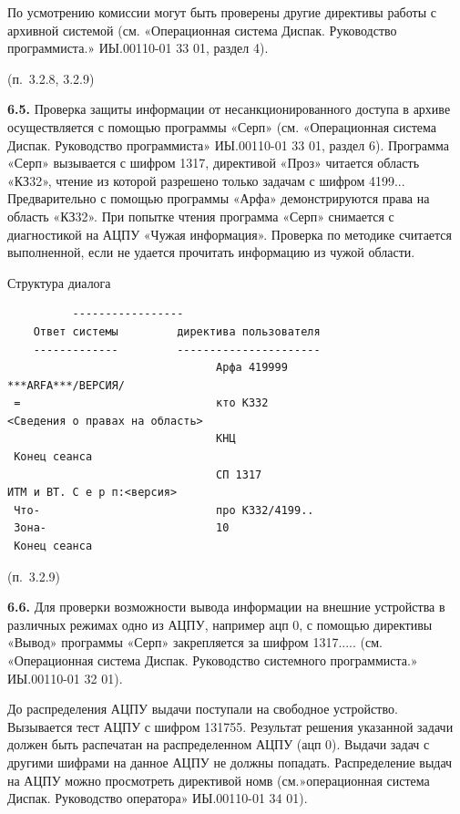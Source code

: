 \documentclass[11pt,a4paper]{article}
\begin{document}
По усмотрению комиссии могут быть проверены другие директивы работы с архивной системой (см. «Операционная система Диспак. Руководство программиста.» ИЫ.00110-01 33 01, раздел 4).

\begin{center}(п.~3.2.8, 3.2.9)\end{center}
\par\textbf{6.5.} Проверка защиты информации от несанкционированного доступа в архиве осуществляется с помощью программы «Серп» (см. «Операционная система Диспак. Руководство программиста» ИЫ.00110-01 33 01, раздел 6). Программа «Серп» вызывается с шифром 1317, директивой «Проз» читается область «КЗ32», чтение из которой разрешено только задачам с шифром 4199... Предварительно с помощью программы «Арфа» демонстрируются права на область «КЗ32». При попытке чтения программа «Серп» снимается с диагностикой на АЦПУ «Чужая информация». Проверка по методике считается выполненной, если не удается прочитать информацию из чужой области.\par
\begin{center}Структура диалога\end{center}
\begin{center}\small
\begin{BVerbatim}
          -----------------
    Ответ системы         директива пользователя
    -------------         ----------------------
                                Арфа 419999
***ARFA***/ВЕРСИЯ/
 =                              кто КЗ32
<Сведения о правах на область>
                                КНЦ
 Конец сеанса
                                СП 1317
ИТМ и ВТ. С е р п:<версия>
 Что-                           про КЗ32/4199..
 Зона-                          10
 Конец сеанса
\end{BVerbatim}
\end{center}

\begin{center}(п.~3.2.9)\end{center}
\par\textbf{6.6.} Для проверки возможности вывода информации на внешние устройства в различных режимах одно из АЦПУ, например ацп 0, с помощью директивы «Вывод» программы «Серп» закрепляется за шифром 1317..... (см. «Операционная система Диспак. Руководство системного программиста.» ИЫ.00110-01 32 01).\par
До распределения АЦПУ выдачи поступали на свободное устройство. Вызывается тест АЦПУ с шифром 131755. Результат решения указанной задачи должен быть распечатан на распределенном АЦПУ (ацп 0). Выдачи задач с другими шифрами на данное АЦПУ не должны попадать. Распределение выдач на АЦПУ можно просмотреть директивой номв (см.»операционная система Диспак. Руководство оператора» ИЫ.00110-01 34 01).
\end{document}
